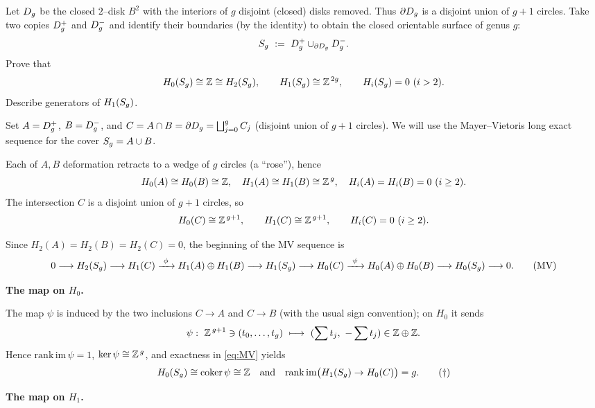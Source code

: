 \begin{exercise}\label{ex:genusg}
Let $D_g$ be the closed $2$–disk $B^2$ with the interiors of $g$ disjoint
(closed) disks removed. Thus $\partial D_g$ is a disjoint union of $g{+}1$ circles.
Take two copies $D_g^+$ and $D_g^-$ and identify their boundaries
(by the identity) to obtain the closed orientable surface of genus $g$:
\[
S_g \ :=\ D_g^+ \cup_{\partial D_g} D_g^- .
\]
Prove that
\[
H_0(S_g)\cong \mathbb{Z} \cong H_2(S_g),\qquad
H_1(S_g)\cong \mathbb{Z}^{\,2g},\qquad
H_i(S_g)=0\ (i>2).
\]
Describe generators of $H_1(S_g)$.
\end{exercise}

\begin{solution}
Set $A=D_g^+$, $B=D_g^-$, and $C=A\cap B=\partial D_g=\bigsqcup_{j=0}^g C_j$ (disjoint
union of $g{+}1$ circles).
We will use the Mayer--Vietoris long exact sequence for the cover $S_g=A\cup B$.


Each of $A,B$ deformation retracts to a wedge of $g$ circles (a ``rose''), hence
\[
H_0(A)\cong H_0(B)\cong \mathbb{Z},\quad H_1(A)\cong H_1(B)\cong \mathbb{Z}^{\,g},\quad
H_i(A)=H_i(B)=0\ (i\ge 2).
\]
The intersection $C$ is a disjoint union of $g{+}1$ circles, so
\[
H_0(C)\cong \mathbb{Z}^{\,g+1},\qquad H_1(C)\cong \mathbb{Z}^{\,g+1},\qquad H_i(C)=0\ (i\ge 2).
\]


Since $H_2(A)=H_2(B)=H_2(C)=0$, the beginning of the MV sequence is
\[
0 \longrightarrow H_2(S_g)
\longrightarrow H_1(C)\xrightarrow{\ \phi\ } H_1(A)\oplus H_1(B)
\longrightarrow H_1(S_g)
\longrightarrow H_0(C)\xrightarrow{\ \psi\ } H_0(A)\oplus H_0(B)
\longrightarrow H_0(S_g)\longrightarrow 0.
\tag{MV}\label{eq:MV}
\]

\medskip\noindent\textbf{The map on $H_0$.}

The map $\psi$ is induced by the two inclusions $C\to A$ and $C\to B$
(with the usual sign convention); on $H_0$ it sends
\[
\psi:\ \mathbb{Z}^{\,g+1}\ni (t_0,\dots,t_g)\ \longmapsto\ (\sum t_j,\ -\sum t_j)\in \mathbb{Z}\oplus\mathbb{Z}.
\]
Hence $\mathrm{rank}\,\mathrm{im}\,\psi=1$, $\ker\psi\cong \mathbb{Z}^{\,g}$, and exactness
in \eqref{eq:MV} yields
\[
H_0(S_g)\cong \mathrm{coker}\,\psi \cong \mathbb{Z}
\quad\text{and}\quad
\mathrm{rank}\,\mathrm{im}\big(H_1(S_g)\to H_0(C)\big)=g.
\tag{$\dagger$}
\]

\medskip\noindent\textbf{The map on $H_1$.}


\end{solution}
